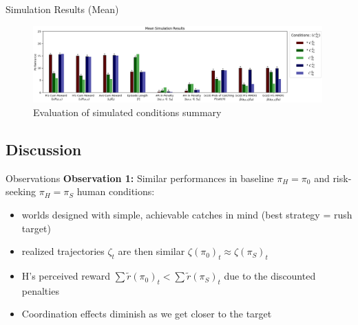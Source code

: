 \documentclass[aspectratio=1610, xcolor=dvipsnames]{packages/beamer}
\begin{document}
\begin{frame}{Simulation Results (Mean)}
     \begin{figure} \centering
        \includegraphics[width=0.99\textwidth]{../results/policy_comparisons/Fig_AssumptionComparison_Summary}
        \caption{Evaluation of simulated conditions summary}
        \label{fig:PolicyCompSummary}
    \end{figure}
\end{frame}

\subsection{Discussion}

\begin{frame}{Observations}
        \textbf{Observation 1:} Similar performances in baseline $\pi_H = \pi_0$ and risk-seeking $\pi_H = \pi_S$ human conditions:
        \begin{itemize}
            \item worlds designed with simple, achievable catches in mind (best strategy = rush target)
            \item realized trajectories $\zeta_t$ are then similar $\zeta(\pi_0)_t \approx \zeta(\pi_S)_t$
            \item H's perceived reward $\sum \tilde{r}(\pi_0)_t < \sum \tilde{r}(\pi_S)_t$ due to the discounted penalties
            \item Coordination effects diminish as we get closer to the target
        \end{itemize}
\end{frame}
\end{document}
